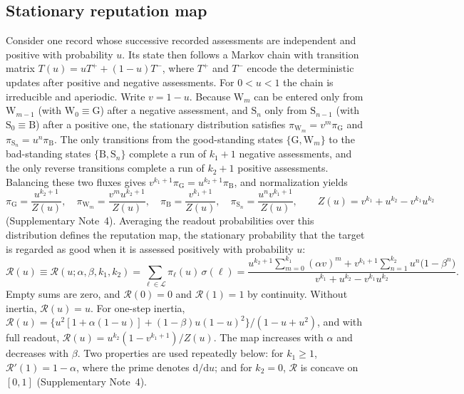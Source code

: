 \subsection*{Stationary reputation map}

Consider one record whose successive recorded assessments are independent and
positive with probability $u$. Its state then follows a Markov chain with
transition matrix $T(u)=uT^{+}+(1-u)T^{-}$, where $T^{+}$ and $T^{-}$ encode the
deterministic updates after positive and negative assessments. For $0<u<1$ the
chain is irreducible and aperiodic. Write $v=1-u$. Because $\mathrm W_m$ can be
entered only from $\mathrm W_{m-1}$ (with $\mathrm W_0\equiv\mathrm G$) after a
negative assessment, and $\mathrm S_n$ only from $\mathrm S_{n-1}$ (with
$\mathrm S_0\equiv\mathrm B$) after a positive one, the stationary distribution
satisfies $\pi_{\mathrm W_m}=v^m\pi_{\mathrm G}$ and
$\pi_{\mathrm S_n}=u^n\pi_{\mathrm B}$. The only transitions from the
good-standing states $\{\mathrm G,\mathrm W_m\}$ to the bad-standing states
$\{\mathrm B,\mathrm S_n\}$ complete a run of $k_1+1$ negative assessments, and
the only reverse transitions complete a run of $k_2+1$ positive assessments.
Balancing these two fluxes gives $v^{k_1+1}\pi_{\mathrm G}=u^{k_2+1}\pi_{\mathrm B}$,
and normalization yields
\begin{equation}
\pi_{\mathrm G}=\frac{u^{k_2+1}}{Z(u)},\quad
\pi_{\mathrm W_m}=\frac{v^{m}u^{k_2+1}}{Z(u)},\quad
\pi_{\mathrm B}=\frac{v^{k_1+1}}{Z(u)},\quad
\pi_{\mathrm S_n}=\frac{u^{n}v^{k_1+1}}{Z(u)},\qquad
Z(u)=v^{k_1}+u^{k_2}-v^{k_1}u^{k_2}
\label{eq:m-stationary}
\end{equation}
(Supplementary Note~4). Averaging the readout probabilities over this
distribution defines the reputation map, the stationary probability that the
target is regarded as good when it is assessed positively with probability $u$:
\begin{equation}
\mathcal R(u)\equiv\mathcal R(u;\alpha,\beta,k_1,k_2)
=\sum_{\ell\in\mathcal L}\pi_\ell(u)\,\sigma(\ell)
=\frac{u^{k_2+1}\sum_{m=0}^{k_1}(\alpha v)^m
+v^{k_1+1}\sum_{n=1}^{k_2}u^n\bigl(1-\beta^n\bigr)}
{v^{k_1}+u^{k_2}-v^{k_1}u^{k_2}} .
\label{eq:m-reputation-map}
\end{equation}
Empty sums are zero, and $\mathcal R(0)=0$ and $\mathcal R(1)=1$ by continuity.
Without inertia, $\mathcal R(u)=u$. For one-step inertia,
$\mathcal R(u)=\{u^2[1+\alpha(1-u)]+(1-\beta)u(1-u)^2\}/(1-u+u^2)$, and with
full readout, $\mathcal R(u)=u^{k_2}(1-v^{k_1+1})/Z(u)$. The map increases with
$\alpha$ and decreases with $\beta$. Two properties are used repeatedly below:
for $k_1\ge1$, $\mathcal R'(1)=1-\alpha$, where the prime denotes $\mathrm d/\mathrm du$;
and for $k_2=0$, $\mathcal R$ is concave on $[0,1]$
(Supplementary Note~4).

